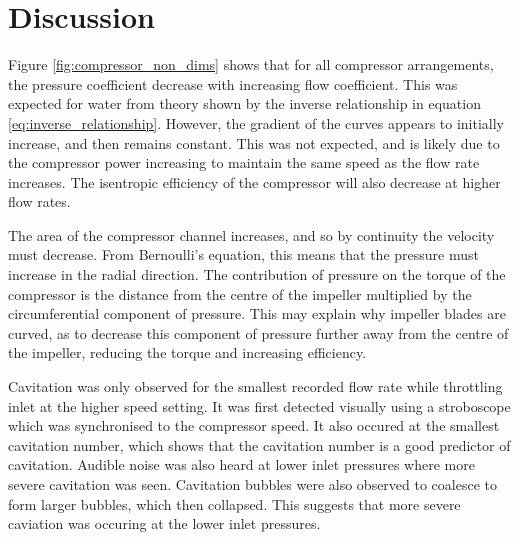 \documentclass{article}
\begin{document}

\section{Discussion}

Figure \ref{fig:compressor_non_dims} shows that for all compressor arrangements, the pressure coefficient decrease with increasing flow coefficient.
This was expected for water from theory shown by the inverse relationship in equation \ref{eq:inverse_relationship}.
However, the gradient of the curves appears to initially increase, and then remains constant.
This was not expected, and is likely due to the compressor power increasing to maintain the same speed as the flow rate increases.
The isentropic efficiency of the compressor will also decrease at higher flow rates.

The area of the compressor channel increases, and so by continuity the velocity must decrease.
From Bernoulli's equation, this means that the pressure must increase in the radial direction.
The contribution of pressure on the torque of the compressor is the distance from the centre of the impeller multiplied by the circumferential component of pressure.
This may explain why impeller blades are curved, as to decrease this component of pressure further away from the centre of the impeller, reducing the torque and increasing efficiency.




Cavitation was only observed for the smallest recorded flow rate while throttling inlet at the higher speed setting.
It was first detected visually using a stroboscope which was synchronised to the compressor speed.
It also occured at the smallest cavitation number, which shows that the cavitation number is a good predictor of cavitation.
Audible noise was also heard at lower inlet pressures where more severe cavitation was seen.
Cavitation bubbles were also observed to coalesce to form larger bubbles, which then collapsed.
This suggests that more severe caviation was occuring at the lower inlet pressures.
\end{document}
